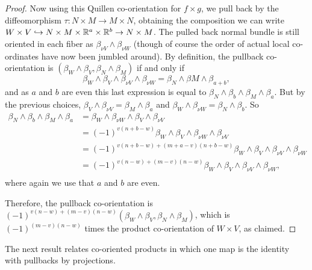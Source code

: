\begin{proof}
Now using this Quillen co-orientation for $f\times g$,  we pull back by the diffeomorphism $\tau:N\times M\to M\times N$,  obtaining the composition we can write $W\times V\hookrightarrow N\times M\times \mathbb{R}^a\times \mathbb{R}^b\to N\times M$. The pulled back normal bundle is still oriented in each fiber as $\beta_{\nu V}\wedge \beta_{\nu W}$ (though of course the order of actual local co-ordinates have now been jumbled around). By definition, the pullback co-orientation is $(\beta_W\wedge \beta_V,\beta_N\wedge \beta_M)$ if and only if $$\beta_W\wedge \beta_V\wedge \beta_{\nu V}\wedge \beta_{\nu W}=\beta_N\wedge \beta M\wedge \beta_{a+b},$$
and as $a$ and $b$ are even this last expression is equal to
$\beta_N\wedge \beta_b\wedge \beta_M\wedge \beta_{a}.$ But by the previous choices, $\beta_V\wedge \beta_{\nu V}=\beta_M\wedge \beta_a$ and  $\beta_W\wedge \beta_{\nu W}=\beta_N\wedge \beta_b$. So
\begin{align*}
\beta_N\wedge \beta_b\wedge \beta_M\wedge \beta_{a}&=\beta_W\wedge \beta_{\nu W}\wedge  \beta_V\wedge \beta_{\nu V}\\
&=(-1)^{v(n+b-w)}\beta_W\wedge  \beta_V\wedge \beta_{\nu W}\wedge \beta_{\nu V}\\
&=(-1)^{v(n+b-w)+(m+a-v)(n+b-w)}\beta_W\wedge  \beta_V\wedge \beta_{\nu V}\wedge \beta_{\nu W}\\
&=(-1)^{v(n-w)+(m-v)(n-w)}\beta_W\wedge  \beta_V\wedge \beta_{\nu V}\wedge \beta_{\nu W},\\
\end{align*}
where again we use that $a$ and $b$ are even.

Therefore, the pullback co-orientation is $(-1)^{v(n-w)+(m-v)(n-w)}(\beta_W\wedge \beta_V,\beta_N \wedge \beta_M)$, which is $(-1)^{(m-v)(n-w)}$ times the product co-orientation of $W\times V$, as claimed.
\end{proof}


The next result relates co-oriented products in which one map is the identity with pullbacks by projections.

